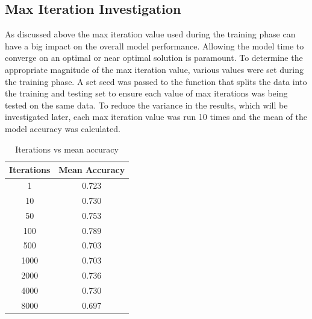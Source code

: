 \documentclass[10pt,twocolumn,letterpaper]{article}
\begin{document}
\subsection{Max Iteration Investigation}
As discussed above the max iteration value used during the training phase can have a big impact on the
overall model performance. Allowing the model time to converge on an optimal or near optimal solution is
paramount. To determine the appropriate magnitude of the max iteration value, various values were set
during the training phase. A set seed was passed to the function that splits the data into the training
and testing set to ensure each value of max iterations was being tested on the same data.
To reduce the variance in the results,
which will be investigated later, each max iteration value was run 10 times and the mean of the model accuracy
was calculated.
\begin{table}[h!]
   \centering
   \begin{tabular}{ ||c c|| }
      \hline
      Iterations & Mean Accuracy \\
      \hline
      1          & 0.723         \\
      \hline
      10         & 0.730         \\
      \hline
      50         & 0.753         \\
      \hline
      100        & 0.789         \\
      \hline
      500        & 0.703         \\
      \hline
      1000       & 0.703         \\
      \hline
      2000       & 0.736         \\
      \hline
      4000       & 0.730         \\
      \hline
      8000       & 0.697         \\
      \hline
   \end{tabular}      \label{tab:iterations}
   \caption{Iterations vs mean accuracy}
\end{table}
\end{document}
